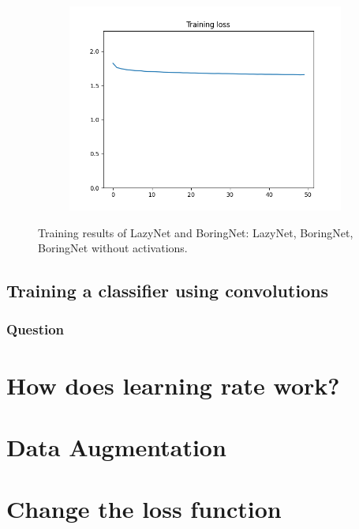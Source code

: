\documentclass[12pt]{article}
\begin{document}
\begin{figure}
\begin{subfigure}{0.16\textwidth}
    \includegraphics[width=\linewidth]{loss_2_2_1.png}
    \caption{}
    \label{fig:2_2_1}
  \end{subfigure}
  \caption{Training results of LazyNet and BoringNet:  LazyNet,  BoringNet,  BoringNet without activations.}
  \label{fig:images}
\end{figure}

\subsection{Training a classifier using convolutions}
\subsubsection{Question}

\section{How does learning rate work?}

\section{Data Augmentation}

\section{Change the loss function}
\end{document}
